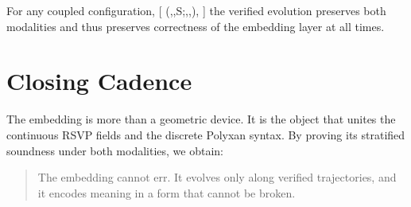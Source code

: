 \begin{corollary}
For any coupled configuration,
[
(\Phi,,S;,,\iota),
]
the verified evolution preserves both modalities and thus preserves correctness of the embedding layer at all times.
\end{corollary}

\section{Closing Cadence}

The embedding is more than a geometric device.
It is the object that unites the continuous RSVP fields and the discrete Polyxan syntax.
By proving its stratified soundness under both modalities, we obtain:

\begin{quote}
The embedding cannot err.
It evolves only along verified trajectories,
and it encodes meaning in a form that cannot be broken.
\end{quote}

